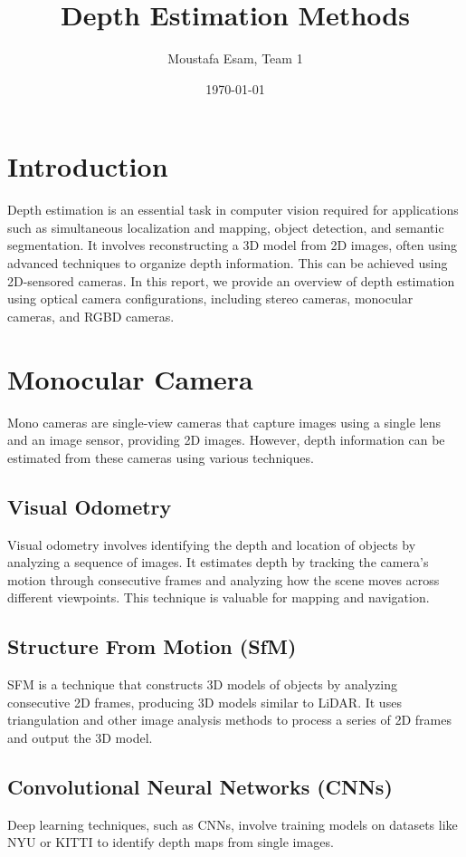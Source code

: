 \documentclass{article}
\title{Depth Estimation Methods}
\author{Moustafa Esam, Team 1}
\date{\today}
\begin{document}
\maketitle

\section{Introduction}
Depth estimation is an essential task in computer vision required for applications such as simultaneous localization and mapping, object detection, and semantic segmentation. It involves reconstructing a 3D model from 2D images, often using advanced techniques to organize depth information. This can be achieved using 2D-sensored cameras. In this report, we provide an overview of depth estimation using optical camera configurations, including stereo cameras, monocular cameras, and RGBD cameras.

\section{Monocular Camera}
Mono cameras are single-view cameras that capture images using a single lens and an image sensor, providing 2D images. However, depth information can be estimated from these cameras using various techniques.

\subsection{Visual Odometry}
Visual odometry involves identifying the depth and location of objects by analyzing a sequence of images. It estimates depth by tracking the camera's motion through consecutive frames and analyzing how the scene moves across different viewpoints. This technique is valuable for mapping and navigation.

\subsection{Structure From Motion (SfM)}
SFM is a technique that constructs 3D models of objects by analyzing consecutive 2D frames, producing 3D models similar to LiDAR. It uses triangulation and other image analysis methods to process a series of 2D frames and output the 3D model.

\subsection{Convolutional Neural Networks (CNNs)}
Deep learning techniques, such as CNNs, involve training models on datasets like NYU or KITTI to identify depth maps from single images.
\end{document}

